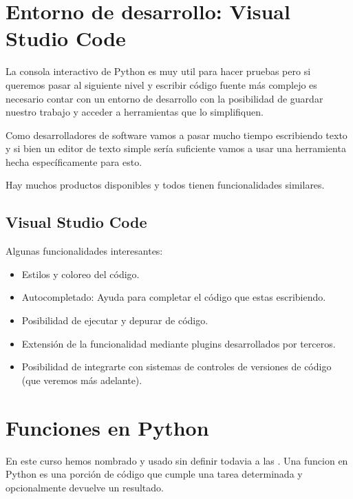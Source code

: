 \documentclass[a4paper,12pt,spanish]{sphinxmanual}
\begin{document}
\sphinxstepscope


\chapter{Entorno de desarrollo: Visual Studio Code}
\label{\detokenize{vscode:entorno-de-desarrollo-visual-studio-code}}\label{\detokenize{vscode::doc}}
\sphinxAtStartPar
La consola interactivo de Python es muy util para hacer pruebas pero si
queremos pasar al siguiente nivel y escribir código fuente más complejo
es necesario contar con un entorno de desarrollo con la posibilidad de
guardar nuestro trabajo y acceder a herramientas que lo simplifiquen.

\sphinxAtStartPar
Como desarrolladores de software vamos a pasar mucho tiempo escribiendo
texto y si bien un editor de texto simple sería suficiente vamos a usar
una herramienta hecha específicamente para esto.

\sphinxAtStartPar
Hay muchos productos disponibles y todos tienen funcionalidades similares.


\section{Visual Studio Code}
\label{\detokenize{vscode:visual-studio-code}}
\noindent{}

\sphinxAtStartPar
Algunas funcionalidades interesantes:
\begin{itemize}
\item {} 
\sphinxAtStartPar
Estilos y coloreo del código.

\item {} 
\sphinxAtStartPar
Autocompletado: Ayuda para completar el código que estas escribiendo.

\item {} 
\sphinxAtStartPar
Posibilidad de ejecutar y depurar de código.

\item {} 
\sphinxAtStartPar
Extensión de la funcionalidad mediante plugins desarrollados por terceros.

\item {} 
\sphinxAtStartPar
Posibilidad de integrarte con sistemas de controles de versiones de
código (que veremos más adelante).

\end{itemize}

\sphinxstepscope


\chapter{Funciones en Python}
\label{\detokenize{fn:funciones-en-python}}\label{\detokenize{fn::doc}}
\sphinxAtStartPar
En este curso hemos nombrado y usado sin definir todavia a las .
Una funcion en Python es una porción de código que cumple una tarea determinada
y opcionalmente devuelve un resultado.
\end{document}
